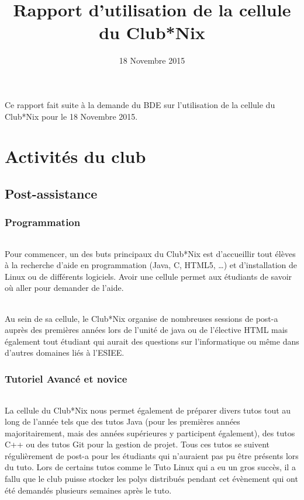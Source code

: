 \documentclass[11pt]{report}
\title{Rapport d'utilisation de la cellule du Club*Nix}
\date{18 Novembre 2015}
\begin{document}
\maketitle

\paragraph{} Ce rapport fait suite à la demande du BDE sur l'utilisation de la
cellule du Club*Nix pour le 18 Novembre 2015.

\tableofcontents

\part{Activités du club}

\chapter{Post-assistance}

\section{Programmation}
\paragraph{} Pour commencer, un des buts principaux du Club*Nix est
d'accueillir tout élèves à la recherche d'aide en programmation (Java, C, HTML5,
\ldots) et d'installation de Linux ou de différents logiciels. Avoir une cellule
permet aux étudiants de savoir où aller pour demander de l'aide.

\paragraph{} Au sein de sa cellule, le Club*Nix organise de nombreuses sessions
de post-a auprès des premières années lors de l'unité de java ou de l'élective
HTML mais également tout étudiant qui aurait des questions sur l'informatique
ou même dans d'autres domaines liés à l'ESIEE.  

\section{Tutoriel Avancé et novice}
\paragraph{} La cellule du Club*Nix nous permet également de préparer divers
tutos tout au long de l'année tels que des tutos Java (pour les premières
années majoritairement, mais des années supérieures y participent également),
des tutos C++ ou des tutos Git pour la gestion de projet. Tous ces tutos se
suivent régulièrement de post-a pour les étudiants qui n'auraient pas pu être
présents lors du tuto. Lors de certains tutos comme le Tuto Linux qui a eu un
gros succès, il a fallu que le club puisse stocker les polys distribués pendant
cet évènement qui ont été demandés plusieurs semaines après le tuto.
\end{document}
